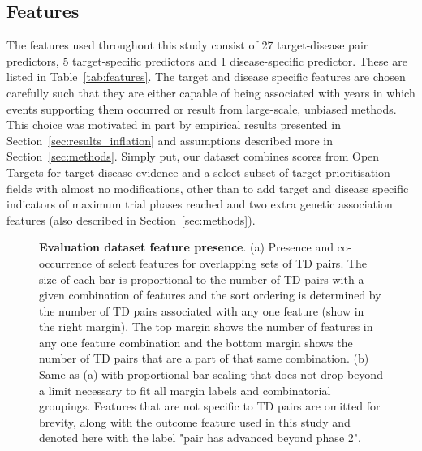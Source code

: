 \documentclass{article}
\begin{document}
\subsection{Features}
\label{sec:features}

The features used throughout this study consist of 27 target-disease pair predictors, 5 target-specific predictors and 1 disease-specific predictor. These are listed in Table~\ref{tab:features}. The target and disease specific features are chosen carefully such that they are either capable of being associated with years in which events supporting them occurred or result from large-scale, unbiased methods. This choice was motivated in part by empirical results presented in Section~\ref{sec:results_inflation} and assumptions described more in Section~\ref{sec:methods}. Simply put, our dataset combines scores from Open Targets for target-disease evidence and a select subset of target prioritisation \cite{OTtargetPrioritisation} fields with almost no modifications, other than to add target and disease specific indicators of maximum trial phases reached and two extra genetic association features (also described in Section~\ref{sec:methods}).

\begin{figure}[!htb]
  \centering
  \captionsetup{width=.9\linewidth}
  \captionsetup[subfigure]{labelformat=empty}
  \qquad
  \caption{
    \textbf{Evaluation dataset feature presence}.
    (a) Presence and co-occurrence of select features for overlapping sets of TD pairs. The size of each bar is proportional to the number of TD pairs with a given combination of features and the sort ordering is determined by the number of TD pairs associated with any one feature (show in the right margin). The top margin shows the number of features in any one feature combination and the bottom margin shows the number of TD pairs that are a part of that same combination.
    (b) Same as (a) with proportional bar scaling that does not drop beyond a limit necessary to fit all margin labels and combinatorial groupings. Features that are not specific to TD pairs are omitted for brevity, along with the outcome feature used in this study and denoted here with the label "pair has advanced beyond phase 2".
  }
  \label{fig:feature_presence}
\end{figure}
\end{document}
